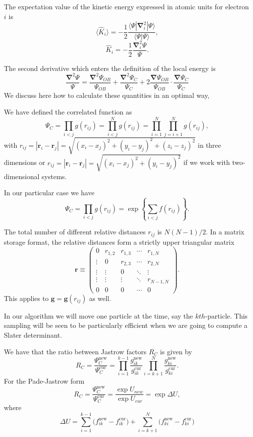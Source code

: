 \documentclass[%
oneside,                 %
final,                   %
10pt]{article}
\begin{document}
The expectation value of the kinetic energy expressed in atomic units for electron $i$ is 
\[
 \langle \hat{K}_i \rangle = -\frac{1}{2}\frac{\langle\Psi|\mathbf{\nabla}_{i}^2|\Psi \rangle}{\langle\Psi|\Psi \rangle},
\]
\[
\hat{K}_i = -\frac{1}{2}\frac{\mathbf{\nabla}_{i}^{2} \Psi}{\Psi}.
\]

The second derivative which enters the definition of the local energy is 
\[
\frac{\mathbf{\nabla}^2 \Psi}{\Psi}=\frac{\mathbf{\nabla}^2 \Psi_{OB}}{\Psi_{OB}} + \frac{\mathbf{\nabla}^2  \Psi_C}{ \Psi_C} + 2 \frac{\mathbf{\nabla}  \Psi_{OB}}{\Psi_{OB}}\cdot\frac{\mathbf{\nabla}   \Psi_C}{ \Psi_C}
\]
We discuss here how to calculate these quantities in an optimal way,

We have defined the correlated function as
\[
\Psi_C=\prod_{i< j}g(r_{ij})=\prod_{i< j}^Ng(r_{ij})= \prod_{i=1}^N\prod_{j=i+1}^Ng(r_{ij}),
\]
with 
$r_{ij}=|\mathbf{r}_i-\mathbf{r}_j|=\sqrt{(x_i-x_j)^2+(y_i-y_j)^2+(z_i-z_j)^2}$ in three dimensions or
$r_{ij}=|\mathbf{r}_i-\mathbf{r}_j|=\sqrt{(x_i-x_j)^2+(y_i-y_j)^2}$ if we work with two-dimensional systems.

In our particular case we have
\[
\Psi_C=\prod_{i< j}g(r_{ij})=\exp{\left\{\sum_{i<j}f(r_{ij})\right\}}.
\]

The total number of different relative distances $r_{ij}$ is $N(N-1)/2$. In a matrix storage format, the relative distances  form a strictly upper triangular matrix
\[
 \mathbf{r} \equiv \begin{pmatrix}
  0 & r_{1,2} & r_{1,3} & \cdots & r_{1,N} \\
  \vdots & 0       & r_{2,3} & \cdots & r_{2,N} \\
  \vdots & \vdots  & 0  & \ddots & \vdots  \\
  \vdots & \vdots  & \vdots  & \ddots  & r_{N-1,N} \\
  0 & 0  & 0  & \cdots  & 0
 \end{pmatrix}.
\]
This applies to  $\mathbf{g} = \mathbf{g}(r_{ij})$ as well. 

In our algorithm we will move one particle  at the time, say the $kth$-particle.  This sampling will be seen to be particularly efficient when we are going to compute a Slater determinant. 

We have that the ratio between Jastrow factors $R_C$ is given by
\[
R_{C} = \frac{\Psi_{C}^\mathrm{new}}{\Psi_{C}^\mathrm{cur}} =
\prod_{i=1}^{k-1}\frac{g_{ik}^\mathrm{new}}{g_{ik}^\mathrm{cur}}
\prod_{i=k+1}^{N}\frac{ g_{ki}^\mathrm{new}} {g_{ki}^\mathrm{cur}}.
\]
For the Pade-Jastrow form
\[
 R_{C} = \frac{\Psi_{C}^\mathrm{new}}{\Psi_{C}^\mathrm{cur}} = 
\frac{\exp{U_{new}}}{\exp{U_{cur}}} = \exp{\Delta U},
\]
where
\[
\Delta U =
\sum_{i=1}^{k-1}\big(f_{ik}^\mathrm{new}-f_{ik}^\mathrm{cur}\big)
+
\sum_{i=k+1}^{N}\big(f_{ki}^\mathrm{new}-f_{ki}^\mathrm{cur}\big)
\]
\end{document}
